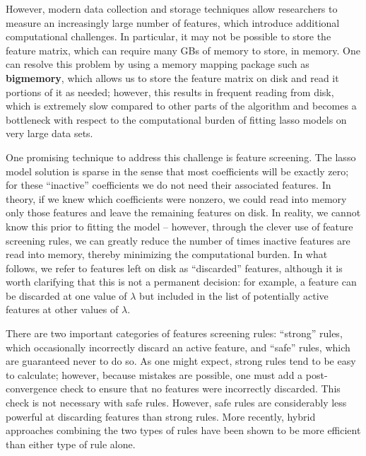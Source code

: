 \documentclass{article}
\begin{document}
However, modern data collection and storage techniques allow researchers to measure an increasingly large number of features, which introduce additional computational challenges. In particular, it may not be possible to store the feature matrix, which can require many GBs of memory to store, in memory. One can resolve this problem by using a memory mapping package such as \textbf{bigmemory}, which allows us to store the feature matrix on disk and read it portions of it as needed; however, this results in frequent reading from disk, which is extremely slow compared to other parts of the algorithm and becomes a bottleneck with respect to the computational burden of fitting lasso models on very large data sets.

One promising technique to address this challenge is feature screening. The lasso model solution is sparse in the sense that most coefficients will be exactly zero; for these ``inactive'' coefficients we do not need their associated features.  In theory, if we knew which coefficients were nonzero, we could read into memory only those features and leave the remaining features on disk. In reality, we cannot know this prior to fitting the model -- however, through the clever use of feature screening rules, we can greatly reduce the number of times inactive features are read into memory, thereby minimizing the computational burden.  In what follows, we refer to features left on disk as ``discarded'' features, although it is worth clarifying that this is not a permanent decision: for example, a feature can be discarded at one value of $\lambda$ but included in the list of potentially active features at other values of $\lambda$.

There are two important categories of features screening rules: ``strong'' rules\cite{tibshirani2011regression}, which occasionally incorrectly discard an active feature, and ``safe'' rules\cite{ghaoui2010safe,wang2013lasso,xiang2012fast, xiang2011learning}, which are guaranteed never to do so.  As one might expect, strong rules tend to be easy to calculate; however, because mistakes are possible, one must add a post-convergence check to ensure that no features were incorrectly discarded.  This check is not necessary with safe rules.  However, safe rules are considerably less powerful at discarding features than strong rules.  More recently, hybrid approaches \cite{zeng2017efficient} combining the two types of rules have been shown to be more efficient than either type of rule alone.
\end{document}
